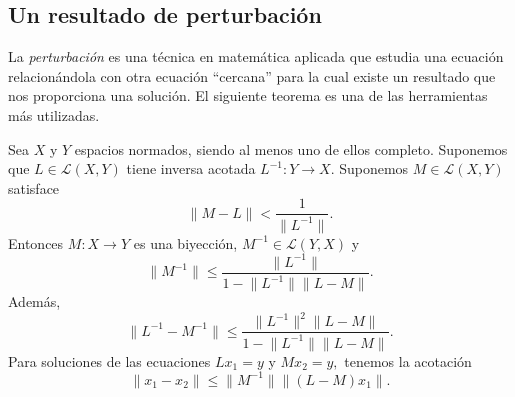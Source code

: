 \subsection{Un resultado de perturbación}
La \textit{perturbación} es una técnica en matemática aplicada que estudia una ecuación relacionándola con otra ecuación ``cercana'' para la cual existe un resultado que nos proporciona una solución. El siguiente teorema es una de las herramientas más utilizadas.

\begin{teorema}
	Sea $X$ y $Y$ espacios normados, siendo al menos uno de ellos completo. Suponemos que $L \in \mathcal{L}(X,Y)$ tiene inversa acotada $L^{-1}: Y \rightarrow X.$ Suponemos $M \in \mathcal{L}(X,Y)$ satisface
	\begin{equation}\label{eq:teo7}
		\lVert M-L \rVert < \dfrac{1}{\lVert L^{-1} \rVert}.
	\end{equation}
	Entonces $M:X\rightarrow Y$ es una biyección, $M^{-1} \in \mathcal{L}(Y,X)$ y 
	\begin{equation}\label{eq:teo5}
		\lVert M^{-1} \rVert \leqslant \dfrac{\lVert L^{-1} \rVert}{1 - \lVert L^{-1} \rVert \lVert L-M \rVert}.
	\end{equation}
	Además,
	\begin{equation}\label{eq:teo4}
		\lVert L^{-1} - M^{-1} \rVert \leqslant \dfrac{\lVert L^{-1} \rVert^2 \lVert L-M \rVert}{1 - \lVert L^{-1} \rVert \lVert L-M \rVert}.
	\end{equation}
	Para soluciones de las ecuaciones $Lx_1 = y$ y $Mx_2 = y,$ tenemos la acotación
	\begin{equation}\label{eq:teo6}
		\lVert x_1 - x_2 \rVert \leqslant \lVert M^{-1} \rVert \lVert (L-M)x_1 \rVert.
	\end{equation}
\end{teorema}
